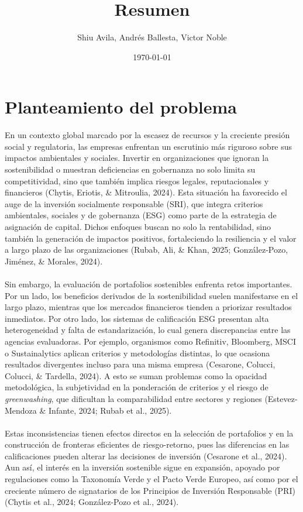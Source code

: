 \documentclass[12pt,a4paper]{article}
\title{Resumen}
\author{Shiu Avila, Andrés Ballesta, Victor Noble}
\date{\today}
\begin{document}
\maketitle

\section{Planteamiento del problema}
En un contexto global marcado por la escasez de recursos y la creciente presión social y regulatoria, las empresas enfrentan un escrutinio más riguroso sobre sus impactos ambientales y sociales. Invertir en organizaciones que ignoran la sostenibilidad o muestran deficiencias en gobernanza no solo limita su competitividad, sino que también implica riesgos legales, reputacionales y financieros (Chytis, Eriotis, \& Mitroulia, 2024). Esta situación ha favorecido el auge de la inversión socialmente responsable (SRI), que integra criterios ambientales, sociales y de gobernanza (ESG) como parte de la estrategia de asignación de capital. Dichos enfoques buscan no solo la rentabilidad, sino también la generación de impactos positivos, fortaleciendo la resiliencia y el valor a largo plazo de las organizaciones (Rubab, Ali, \& Khan, 2025; González-Pozo, Jiménez, \& Morales, 2024).\\
\\
Sin embargo, la evaluación de portafolios sostenibles enfrenta retos importantes. Por un lado, los beneficios derivados de la sostenibilidad suelen manifestarse en el largo plazo, mientras que los mercados financieros tienden a priorizar resultados inmediatos. Por otro lado, los sistemas de calificación ESG presentan alta heterogeneidad y falta de estandarización, lo cual genera discrepancias entre las agencias evaluadoras. Por ejemplo, organismos como Refinitiv, Bloomberg, MSCI o Sustainalytics aplican criterios y metodologías distintas, lo que ocasiona resultados divergentes incluso para una misma empresa (Cesarone, Colucci, Colucci, \& Tardella, 2024). A esto se suman problemas como la opacidad metodológica, la subjetividad en la ponderación de criterios y el riesgo de \textit{greenwashing}, que dificultan la comparabilidad entre sectores y regiones (Estevez-Mendoza \& Infante, 2024; Rubab et al., 2025).\\  
\\
Estas inconsistencias tienen efectos directos en la selección de portafolios y en la construcción de fronteras eficientes de riesgo-retorno, pues las diferencias en las calificaciones pueden alterar las decisiones de inversión (Cesarone et al., 2024). Aun así, el interés en la inversión sostenible sigue en expansión, apoyado por regulaciones como la Taxonomía Verde y el Pacto Verde Europeo, así como por el creciente número de signatarios de los Principios de Inversión Responsable (PRI) (Chytis et al., 2024; González-Pozo et al., 2024).\\  
\end{document}
